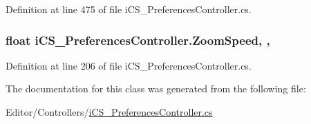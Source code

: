 Definition at line 475 of file i\+C\+S\+\_\+\+Preferences\+Controller.\+cs.

\hypertarget{classi_c_s___preferences_controller_a8b3f2a181182a40312d08314411dacb6}{
\subsubsection[{Zoom\+Speed}]{\setlength{\rightskip}{0pt plus 5cm}float i\+C\+S\+\_\+\+Preferences\+Controller.\+Zoom\+Speed\hspace{0.3cm}{\ttfamily [static]}, {\ttfamily [get]}, {\ttfamily [set]}}}\label{classi_c_s___preferences_controller_a8b3f2a181182a40312d08314411dacb6}


Definition at line 206 of file i\+C\+S\+\_\+\+Preferences\+Controller.\+cs.



The documentation for this class was generated from the following file\+:\begin{DoxyCompactItemize}
\item 
Editor/\+Controllers/\hyperlink{i_c_s___preferences_controller_8cs}{i\+C\+S\+\_\+\+Preferences\+Controller.\+cs}\end{DoxyCompactItemize}
